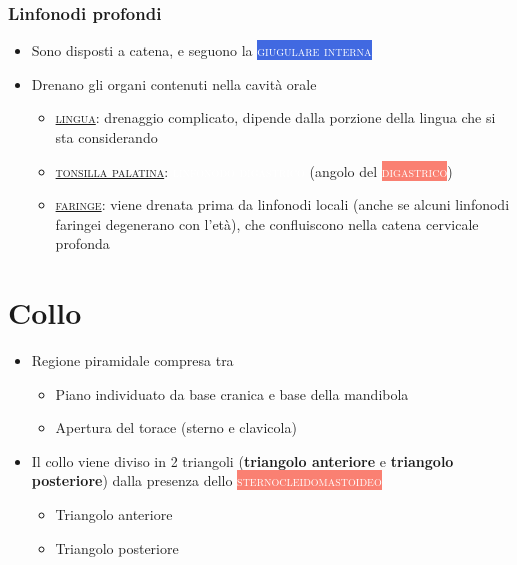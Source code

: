 \documentclass[italian,]{article}
\providecommand{\tightlist}{%
  \setlength{\itemsep}{0pt}\setlength{\parskip}{0pt}}
\newcommand{\asidefigure}[2]{\marginpar{\texttt{[image: \#1]}\\\footnotesize\emph{#2}}}
\newcommand{\mus}[1]{\colorbox{Salmon}{\textcolor{white}{\textsc{#1}}}}
\newcommand{\ven}[1]{\colorbox{RoyalBlue}{\textcolor{white}{\textsc{#1}}}}
\newcommand{\lin}[1]{\colorbox{PineGreen}{\textcolor{white}{\textsc{#1}}}}
\renewcommand{\a}[1]{\underline{\textsc{#1}}}
\begin{document}
\hypertarget{linfonodi-profondi}{%
\subsubsection{Linfonodi profondi}\label{linfonodi-profondi}}

\begin{itemize}
\tightlist
\item
  Sono disposti a catena, e seguono la \ven{giugulare interna}
\item
  Drenano gli organi contenuti nella cavità orale

  \begin{itemize}
  \tightlist
  \item
    \a{lingua}: drenaggio complicato, dipende dalla porzione della
    lingua che si sta considerando
    \asidefigure{img/drenaggio-lingua.png}{}
  \item
    \a{tonsilla palatina}: \lin{linfonodo digastrico} (angolo del
    \mus{digastrico})
  \item
    \a{faringe}: viene drenata prima da linfonodi locali (anche se
    alcuni linfonodi faringei degenerano con l'età), che confluiscono
    nella catena cervicale profonda
  \end{itemize}
\end{itemize}

\hypertarget{collo}{%
\section{Collo}\label{collo}}

\begin{itemize}
\tightlist
\item
  Regione piramidale compresa tra

  \begin{itemize}
  \tightlist
  \item
    Piano individuato da base cranica e base della mandibola
  \item
    Apertura del torace (sterno e clavicola)
  \end{itemize}
\item
  Il collo viene diviso in 2 triangoli (\textbf{triangolo anteriore} e
  \textbf{triangolo posteriore}) dalla presenza dello
  \mus{sternocleidomastoideo} \asidefigure{img/triangoli-collo.png}{}

  \begin{itemize}
  \tightlist
  \item
    Triangolo anteriore
  \item
    Triangolo posteriore
  \end{itemize}
\end{itemize}
\end{document}
